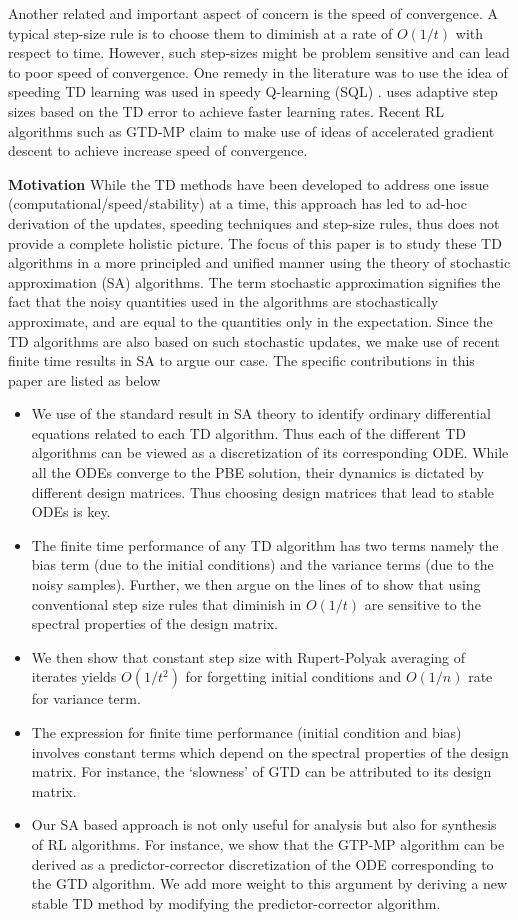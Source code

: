 Another related and important aspect of concern is the speed of convergence. A typical step-size rule is to choose them to diminish at a rate of $O(1/t)$ with respect to time. However, such step-sizes might be problem sensitive and can lead to poor speed of convergence. One remedy in the literature was to use the idea of speeding TD learning was used in speedy Q-learning (SQL) \cite{sql}. \cite{} uses adaptive step sizes based on the TD error to achieve faster learning rates. Recent RL algorithms such as GTD-MP claim to make use of ideas of accelerated gradient descent to achieve increase speed of convergence.\par
\textbf{Motivation} While the TD methods have been developed to address one issue (computational/speed/stability) at a time, this approach has led to ad-hoc derivation of the updates, speeding techniques and step-size rules, thus does not provide a complete holistic picture. The focus of this paper is to study these TD algorithms in a more principled and unified manner using the theory of stochastic approximation (SA) algorithms. The term stochastic approximation signifies the fact that the noisy quantities used in the algorithms are stochastically approximate, and are equal to the quantities only in the expectation. Since the TD algorithms are also based on such stochastic updates, we make use of recent finite time results in SA \cite{} to argue our case. The specific contributions in this paper are listed as below
\begin{itemize}[leftmargin=*] 
\item We use of the standard result in SA theory to identify ordinary differential equations related to each TD algorithm. Thus each of the different TD algorithms can be viewed as a discretization of its corresponding ODE. While all the ODEs converge to the PBE solution, their dynamics is dictated by different design matrices. Thus choosing design matrices that lead to stable ODEs is key.
\item The finite time performance of any TD algorithm has two terms namely the bias term (due to the initial conditions) and the variance terms (due to the noisy samples). Further, we then argue on the lines of \cite{} to show that using conventional step size rules that diminish in $O(1/t)$ are sensitive to the spectral properties of the design matrix.
\item We then show that constant step size with Rupert-Polyak averaging of iterates yields $O(1/t^2)$ for forgetting initial conditions and $O(1/n)$ rate for variance term.
\item The expression for finite time performance (initial condition and bias) involves constant terms which depend on the spectral properties of the design matrix. For instance, the `slowness’ of GTD can be attributed to its design matrix.
\item Our SA based approach is not only useful for analysis but also for synthesis of RL algorithms. For instance, we show that the GTP-MP algorithm can be derived as a predictor-corrector discretization of the ODE corresponding to the GTD algorithm. We add more weight to this argument by deriving a new stable TD method by modifying the predictor-corrector algorithm.
\end{itemize}
